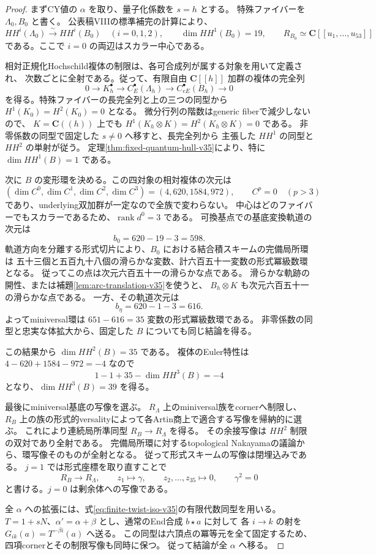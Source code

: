 \begin{proof}
まずCY値の $\alpha$ を取り、量子化係数を $s=h$ とする。
特殊ファイバーを $\Lambda_0,B_0$ と書く。
公表稿VIII\cite{VKAmbient32}の標準補完の計算により、
\[
 HH^i(\Lambda_0)\xrightarrow{\sim}HH^i(B_0)\quad(i=0,1,2),
 \qquad \dim HH^1(B_0)=19,
 \qquad R_{B_0}\simeq\mathbf C[[u_1,\ldots,u_{53}]]
\]
である。ここで $i=0$ の両辺はスカラー中心である。

相対正規化Hochschild複体の制限は、各可合成列が属する対象を用いて定義され、
次数ごとに全射である。従って、有限自由 $\mathbf C[[h]]$ 加群の複体の完全列
\[
 0\longrightarrow K_h^\bullet
 \longrightarrow C_E^\bullet(\Lambda_h)
 \longrightarrow C_{eE}^\bullet(B_h)
 \longrightarrow0
\]
を得る。特殊ファイバーの長完全列と上の三つの同型から
$H^1(K_0)=H^2(K_0)=0$ となる。
微分行列の階数はgeneric fiberで減少しないので、
$K=\mathbf C((h))$ 上でも $H^1(K_h\otimes K)=H^2(K_h\otimes K)=0$ である。
非零係数の同型で固定した $s\ne0$ へ移すと、長完全列から
主張した $HH^1$ の同型と $HH^2$ の単射が従う。
定理\ref{thm:fixed-quantum-hull-v35}により、特に $\dim HH^1(B)=1$ である。

次に $B$ の変形環を決める。この四対象の相対複体の次元は
\[
 (\dim C^0,\dim C^1,\dim C^2,\dim C^3)=(4,620,1584,972),
 \qquad C^p=0\quad(p>3)
\]
であり、underlying双加群が一定なので全族で変わらない。
中心はどのファイバーでもスカラーであるため、$\operatorname{rank}d^0=3$ である。
可換基点での基底変換軌道の次元は
\[
 b_0=620-19-3=598.
\]
軌道方向を分離する形式切片により、$B_0$ における結合積スキームの完備局所環は
五十三個と五百九十八個の滑らかな変数、計六百五十一変数の形式冪級数環となる。
従ってこの点は次元六百五十一の滑らかな点である。
滑らかな軌跡の開性、または補題\ref{lem:arc-translation-v35}を使うと、
$B_h\otimes K$ も次元六百五十一の滑らかな点である。
一方、その軌道次元は
\[
 b_\eta=620-1-3=616.
\]
よってminiversal環は $651-616=35$ 変数の形式冪級数環である。
非零係数の同型と忠実な体拡大から、固定した $B$ についても同じ結論を得る。

この結果から $\dim HH^2(B)=35$ である。
複体のEuler特性は $4-620+1584-972=-4$ なので
\[
 1-1+35-\dim HH^3(B)=-4
\]
となり、$\dim HH^3(B)=39$ を得る。

最後にminiversal基底の写像を選ぶ。
$R_\Lambda$ 上のminiversal族をcornerへ制限し、
$R_B$ 上の族の形式的versalityによって各Artin商上で適合する写像を帰納的に選ぶ。
これにより連続局所準同型 $R_B\to R_\Lambda$ を得る。
その余接写像は $HH^2$ 制限の双対であり全射である。
完備局所環に対するtopological Nakayamaの議論から、環写像そのものが全射となる。
従って形式スキームの写像は閉埋込みである。
$j=1$ では形式座標を取り直すことで
\[
 R_B\longrightarrow R_\Lambda,\qquad
 z_1\longmapsto\gamma,\qquad z_2,\ldots,z_{35}\longmapsto0,
 \qquad \gamma^2=0
\]
と書ける。$j=0$ は剰余体への写像である。

全 $\alpha$ への拡張には、式\eqref{eq:finite-twist-iso-v35}の有限代数同型を用いる。
$T=1+sN$、$\alpha' =\alpha+\beta$ とし、通常のEnd合成 $b\star a$ に対して
各 $i\to k$ の射を $G_{ik}(a)=T^{-\beta i}(a)$ へ送る。
この同型は六頂点の冪等元を全て固定するため、四項cornerとその制限写像も同時に保つ。
従って結論が全 $\alpha$ へ移る。
\end{proof}

